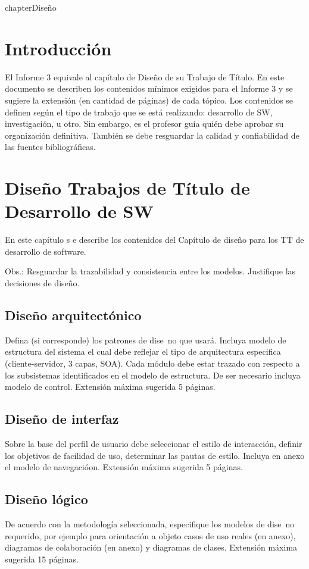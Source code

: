 chapter{Diseño}
\label{capdiseno}

\section{Introducción}

El Informe 3 equivale al capítulo de Diseño de su Trabajo de Título.
 En este documento se describen los contenidos mínimos exigidos para el Informe 3 y se sugiere la extensión (en cantidad de páginas) de cada tópico.
Los contenidos  se definen según el tipo de trabajo que se está realizando: desarrollo de SW, investigación,  u otro.
 Sin embargo, es el profesor guía quién debe aprobar su organización definitiva.
 También se debe resguardar la calidad y confiabilidad de las fuentes bibliográficas.

\section{Diseño Trabajos de Título de Desarrollo de SW}  \label{diseno}
 En este capítulo s e describe los contenidos del Capítulo de diseño para los TT de desarrollo de software.
 
 Obs.: Resguardar la trazabilidad y consistencia entre los modelos. Justifique las
decisiones de diseño.

\subsection{Diseño arquitectónico} \label{disenoarq}
Defina (si corresponde) los patrones de dise~no que usará. Incluya modelo de estructura
del sistema el cual debe reflejar el tipo de arquitectura especifica (cliente-servidor,
3 capas, SOA). Cada módulo debe estar trazado con respecto a los subsistemas identificados en el modelo de estructura.
De ser necesario incluya modelo de control.
Extensión máxima sugerida 5 páginas.


\subsection{Diseño de interfaz} \label{disenoint}
Sobre la base del perfil de usuario debe seleccionar el estilo de interacción, definir
los objetivos de facilidad de uso, determinar las pautas de estilo. Incluya en anexo el
modelo de navegacióon. Extensión máxima sugerida 5 páginas.

\subsection{Diseño lógico} \label{disenolog}
De acuerdo con  la metodología seleccionada, especifique los modelos de dise~no requerido,
por ejemplo para orientación a objeto casos de uso reales (en anexo), diagramas de
colaboración (en anexo) y diagramas de clases. Extensión máxima sugerida 15 páginas.


